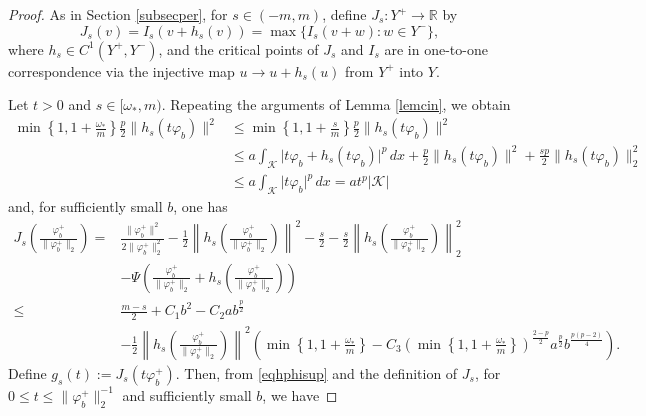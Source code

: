 \documentclass[11pt]{amsart}
\newcommand{\abs}[1]{\lvert#1\rvert}
\newcommand{\norm}[1]{\lVert#1\rVert}
\newcommand{\K}{\mathcal{K}}
\numberwithin{equation}{section}
\begin{document}
\begin{proof}
As in Section \ref{subsecper}, for $s\in (-m,m)$, define $J_s: Y^{+} \rightarrow \mathbb{R}$ by
$$
J_s(v)=I_s(v+h_s(v))=\max \{I_{s}(v+w): w \in Y^{-}\},
$$
where $h_s \in C^1\left(Y^{+}, Y^{-}\right)$, and the critical points of $J_s$ and $I_s$ are in one-to-one correspondence via the injective map $u \rightarrow u+h_s(u)$ from $Y^{+}$ into $Y$.

Let $t > 0$ and $s\in [\omega_*,m)$. Repeating the arguments of Lemma \ref{lemcin}, we obtain
\begin{equation}\label{eqhphisup}
\begin{aligned}
        \min\left\{1, 1 + \frac{\omega_*}{m}\right\}\frac{p}{2}\norm{h_s(t\varphi_b)}^{2} &\leq \min\left\{1, 1 + \frac{s}{m}\right\}\frac{p}{2}\norm{h_s(t\varphi_b)}^{2}\\
        &\leq a\int_{\K}\abs{t\varphi_b+h_s(t\varphi_b)}^{p}\,dx + \frac{p}{2}\norm{h_s(t\varphi_b)}^{2} + \frac{sp}{2}\norm{h_s(t\varphi_b)}^{2}_2 \\
        &\leq a\int_{\K}\abs{t\varphi_b}^{p} \,dx = a t^p\abs{\K}
\end{aligned}
\end{equation}
and, for sufficiently small $b$, one has
\begin{equation*}\label{eqjsmallmsup}
            \begin{aligned}
                J_{s}(\frac{\varphi_b^+}{\norm{\varphi_b^+}_2}) =& \frac{\norm{\varphi_b^+}^2}{2\norm{\varphi_b^+}^2_2}-\frac{1}{2}\left\lVert h_s\left(\frac{\varphi_b^+}{\norm{\varphi_b^+}_2}\right) \right\rVert^2 - \frac{s}{2} - \frac{s}{2}\left\lVert h_s\left(\frac{\varphi_b^+}{\norm{\varphi_b^+}_2}\right) \right\rVert_2^2\\
                &- \Psi\left(\frac{\varphi_b^+}{\norm{\varphi_b^+}_2}+h_s\left(\frac{\varphi_b^+}{\norm{\varphi_b^+}_2}\right)\right)\\
                \leq& \frac{m-s}{2}+ C_1b^2 - C_2ab^\frac{p}{2} \\&- \frac{1}{2}\left\lVert h_s\left(\frac{\varphi_b^+}{\norm{\varphi_b^+}_2}\right)\right\rVert^2\left(\min\left\{1, 1 + \frac{\omega_*}{m}\right\} - C_3 \left(\min\left\{1, 1 + \frac{\omega_*}{m}\right\}\right)^\frac{2-p}{2}a^\frac{p}{2}b^\frac{p(p-2)}{4}\right).
    \end{aligned}
    \end{equation*}
Define $g_s(t):=J_s(t\varphi_b^+)$. Then, from \eqref{eqhphisup} and the definition of $J_s$, for $0 \leq t \leq\norm{\varphi_b^+}_{2} ^{-1}$ and sufficiently small $b$, we have

\end{proof}
\end{document}
